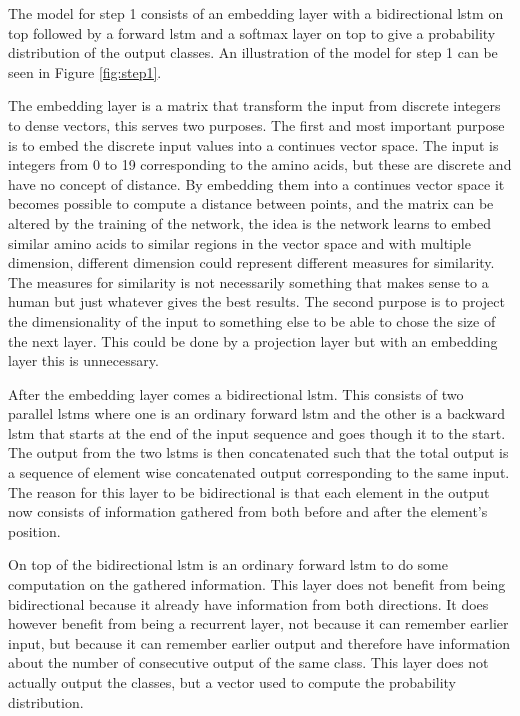 The model for step 1 consists of an embedding layer with a bidirectional \gls{lstm} on top followed by a
forward \gls{lstm} and a softmax layer on top to give a probability distribution of the output classes.
An illustration of the model for step 1 can be seen in Figure \ref{fig:step1}.

The embedding layer is a matrix that transform the input from discrete integers to dense vectors, 
this serves two purposes. The first and most important purpose is to embed the discrete input values 
into a continues vector space. The input is integers from 0 to 19 corresponding to the amino acids, but 
these are discrete and have no concept of distance. By embedding them into a continues vector space 
it becomes possible to compute a distance between points,
and the matrix can be altered by the training of the network, 
the idea is the network learns to embed similar amino acids to similar regions in the vector space
and with multiple dimension, different dimension could represent different measures for similarity. 
The measures for similarity is not necessarily something that makes sense to a human but just whatever 
gives the best results. The second purpose is to project the dimensionality of the input to something else 
to be able to chose the size of the next layer. This could be done by a projection layer but with an embedding 
layer this is unnecessary. 

After the embedding layer comes a bidirectional \gls{lstm}. This consists of two parallel \glspl{lstm} where 
one is an ordinary forward \gls{lstm} and the other is a backward \gls{lstm} that starts at the end of the 
input sequence and goes though it to the start. The output from the two \glspl{lstm} is then concatenated
such that the total output is a sequence of element wise concatenated output corresponding to the same input.
The reason for this layer to be bidirectional is that each element in the output now consists of information
gathered from both before and after the element's position. 

On top of the bidirectional \gls{lstm} is an ordinary forward \gls{lstm} to do some computation on the
gathered information. This layer does not benefit from being bidirectional because it already have 
information from both directions. It does however benefit from being a recurrent layer, not 
because it can remember earlier input, but because it can remember earlier output and therefore have
information about the number of consecutive output of the same class. This layer does not actually 
output the classes, but a vector used to compute the probability distribution.


